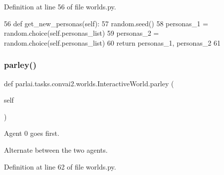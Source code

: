 Definition at line 56 of file worlds.\+py.


\begin{DoxyCode}
56     \textcolor{keyword}{def }get\_new\_personas(self):
57         random.seed()
58         personas\_1 = random.choice(self.personas\_list)
59         personas\_2 = random.choice(self.personas\_list)
60         \textcolor{keywordflow}{return} personas\_1, personas\_2
61 
\end{DoxyCode}
\mbox{\label{classparlai_1_1tasks_1_1convai2_1_1worlds_1_1InteractiveWorld_a75559c133b900cdd71389c9760e9a703}} 
\subsubsection{\texorpdfstring{parley()}{parley()}}
{\footnotesize\ttfamily def parlai.\+tasks.\+convai2.\+worlds.\+Interactive\+World.\+parley (\begin{DoxyParamCaption}\item[{}]{self }\end{DoxyParamCaption})}

\begin{DoxyVerb}Agent 0 goes first.

Alternate between the two agents.
\end{DoxyVerb}
 

Definition at line 62 of file worlds.\+py.


